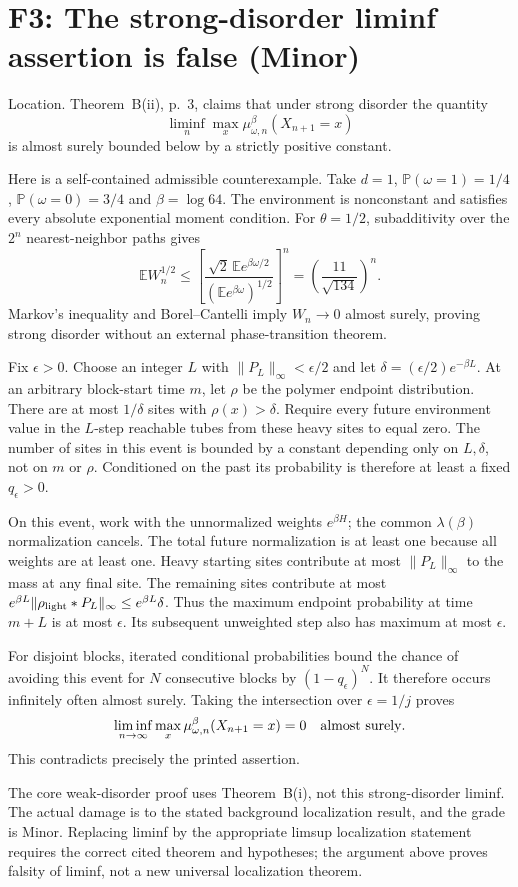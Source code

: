 \documentclass[10pt]{article}
\begin{document}
\section*{F3: The strong-disorder liminf assertion is false (Minor)}
Location. Theorem B(ii), p. 3, claims that under strong disorder the quantity \[\liminf_n\max_x\mu^\beta_{\omega,n}(X_{n+1}=x)\] is almost surely bounded below by a strictly positive constant.\par
Here is a self-contained admissible counterexample. Take \(d=1\), \(\mathbb P(\omega=1)=1/4\), \(\mathbb P(\omega=0)=3/4\) and \(\beta=\log64\). The environment is nonconstant and satisfies every absolute exponential moment condition. For \(\theta=1/2\), subadditivity over the \(2^n\) nearest-neighbor paths gives \[\mathbb EW_n^{1/2}
 \leq\left[
   \frac{\sqrt2\,\mathbb Ee^{\beta\omega/2}}{(\mathbb Ee^{\beta\omega})^{1/2}}
 \right]^n
 =\left(\frac{11}{\sqrt{134}}\right)^n.\] Markov’s inequality and Borel–Cantelli imply \(W_n\to0\) almost surely, proving strong disorder without an external phase-transition theorem.\par
Fix \(\epsilon>0\). Choose an integer \(L\) with \(\|P_L\|_\infty<\epsilon/2\) and let \(\delta=(\epsilon/2)e^{-\beta L}\). At an arbitrary block-start time \(m\), let \(\rho\) be the polymer endpoint distribution. There are at most \(1/\delta\) sites with \(\rho(x)>\delta\). Require every future environment value in the \(L\)-step reachable tubes from these heavy sites to equal zero. The number of sites in this event is bounded by a constant depending only on \(L,\delta\), not on \(m\) or \(\rho\). Conditioned on the past its probability is therefore at least a fixed \(q_\epsilon>0\).\par
On this event, work with the unnormalized weights \(e^{\beta H}\); the common \(\lambda(\beta)\) normalization cancels. The total future normalization is at least one because all weights are at least one. Heavy starting sites contribute at most \(\|P_L\|_\infty\) to the mass at any final site. The remaining sites contribute at most \(e^{\beta L}\|\rho_{\rm light}*P_L\|_\infty\leq e^{\beta L}\delta\). Thus the maximum endpoint probability at time \(m+L\) is at most \(\epsilon\). Its subsequent unweighted step also has maximum at most \(\epsilon\).\par
For disjoint blocks, iterated conditional probabilities bound the chance of avoiding this event for \(N\) consecutive blocks by \((1-q_\epsilon)^N\). It therefore occurs infinitely often almost surely. Taking the intersection over \(\epsilon=1/j\) proves \[\liminf_{n\to\infty}\max_x\mu^\beta_{\omega,n}(X_{n+1}=x)=0
 \quad\hbox{almost surely}.\] This contradicts precisely the printed assertion.\par
The core weak-disorder proof uses Theorem B(i), not this strong-disorder liminf. The actual damage is to the stated background localization result, and the grade is Minor. Replacing liminf by the appropriate limsup localization statement requires the correct cited theorem and hypotheses; the argument above proves falsity of liminf, not a new universal localization theorem.\par
\end{document}
